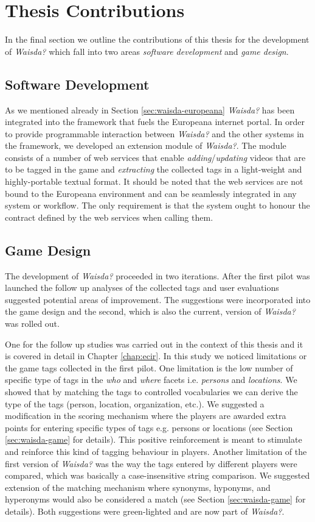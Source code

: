 \section{Thesis Contributions} 
In the final section we outline the contributions of this thesis for the development of \textit{Waisda?} which fall into two areas \textit{software development} and \textit{game design}.
\subsection{Software Development}
As we mentioned already in Section \ref{sec:waisda-europeana} \textit{Waisda?} has been integrated into the framework that fuels the Europeana internet portal. In order to provide programmable interaction between \textit{Waisda?} and the other systems in the framework, we developed an extension module of \textit{Waisda?}. The module consists of a number of web services that enable \textit{adding}/\textit{updating} videos that are to be tagged in the game and \textit{extracting} the collected tags in a light-weight and highly-portable textual format. It should be noted that the web services are not bound to the Europeana environment and can be seamlessly integrated in any system or workflow. The only requirement is that the system ought to honour the contract defined by the web services when calling them.
\subsection{Game Design}
The development of \textit{Waisda?} proceeded in two iterations. After the first pilot was launched the follow up analyses of the collected tags \cite{Annelies,ecir} and user evaluations suggested potential areas of improvement. The suggestions were incorporated into the game design and the second, which is also the current, version of \textit{Waisda?} was rolled out.

One for the follow up studies \cite{ecir} was carried out in the context of this thesis and it is covered in detail in Chapter \ref{chap:ecir}. In this study we noticed limitations or the game tags collected in the first pilot. One limitation is the low number of specific type of tags in the \textit{who} and \textit{where} facets i.e. \textit{persons} and \textit{locations}. We showed that by matching the tags to controlled vocabularies we can derive the type of the tags (person, location, organization, etc.). We suggested a modification in the scoring mechanism where the players are awarded extra points for entering specific types of tags e.g. persons or locations (see Section \ref{sec:waisda-game} for details). This positive reinforcement is meant to stimulate and reinforce this kind of tagging behaviour in players. Another limitation of the first version of \textit{Waisda?} was the way the tags entered by different players were compared, which was basically a case-insensitive string comparison. We suggested extension of the matching mechanism where synonyms, hyponyms, and hyperonyms would also be considered a match (see Section \ref{sec:waisda-game} for details). Both suggestions were green-lighted and are now part of \textit{Waisda?}.

